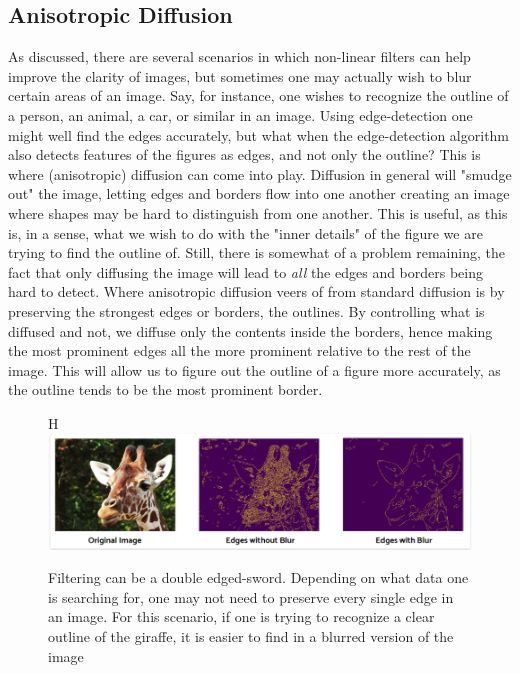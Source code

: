 \documentclass[twoside,a4paper,article]{combine}
\begin{document}
\subsection{Anisotropic Diffusion}
As discussed, there are several scenarios in which non-linear filters can help improve the clarity of images, but sometimes one may actually wish to blur certain areas of an image. Say, for instance, one wishes to recognize the outline of a person, an animal, a car, or similar in an image. Using edge-detection one might well find the edges accurately, but what when the edge-detection algorithm also detects features of the figures as edges, and not only the outline? This is where (anisotropic) diffusion can come into play. Diffusion in general will "smudge out" the image, letting edges and borders flow into one another creating an image where shapes may be hard to distinguish from one another. This is useful, as this is, in a sense, what we wish to do with the "inner details" of the figure we are trying to find the outline of. Still, there is somewhat of a problem remaining, the fact that only diffusing the image will lead to \textit{all} the edges and borders being hard to detect. Where anisotropic diffusion veers of from standard diffusion is by preserving the strongest edges or borders, the outlines. By controlling what is diffused and not, we diffuse only the contents inside the borders, hence making the most prominent edges all the more prominent relative to the rest of the image. This will allow us to figure out the outline of a figure more accurately, as the outline tends to be the most prominent border.
\begin{figure}{H}
    \centering
    \includegraphics[width=1\linewidth]{edgedetection.png}
    \caption{Filtering can be a double edged-sword. Depending on what data one is searching for, one may not need to preserve every single edge in an image. For this scenario, if one is trying to recognize a clear outline of the giraffe, it is easier to find in a blurred version of the image}
    \label{fig:enter-label}
\end{figure}
\end{document}
